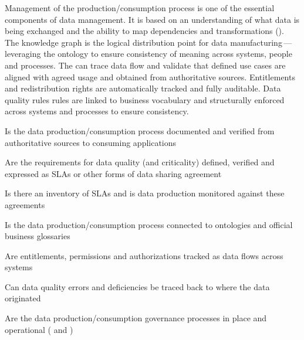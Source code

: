 %
%

\ekgmmCapabilitySectionContributionToEnterprise

Management of the production/consumption process is one of the essential components of data management.
It is based on an understanding of what data is being exchanged and the ability to map dependencies and
transformations ().
The knowledge graph is the logical distribution point for data manufacturing\,---\,leveraging the ontology to ensure
consistency of meaning across systems, people and processes.
The  can trace data flow and validate that defined use cases are aligned with agreed usage and
obtained from authoritative sources.
Entitlements and redistribution rights are automatically tracked and fully auditable.
Data quality rules rules are linked to business vocabulary and structurally enforced
across systems and processes to ensure consistency.

\ekgmmCapabilitySectionDimensions

\begin{core-questions}

  \item [\thesection.1] Is the data production/consumption process documented and verified from authoritative sources
                        to consuming applications
  \item [\thesection.2] Are the requirements for data quality (and criticality) defined, verified and expressed as SLAs
                        or other forms of data sharing agreement
  \item [\thesection.3] Is there an inventory of SLAs and is data production monitored against these agreements
  \item [\thesection.4] Is the data production/consumption process connected to ontologies and
                        official business glossaries
  \item [\thesection.5] Are entitlements, permissions and authorizations tracked as data flows across systems
  \item [\thesection.6] Can data quality errors and deficiencies be traced back to where the data originated
  \item [\thesection.7] Are the data production/consumption governance processes in place and operational
                        ( and )

\end{core-questions}

